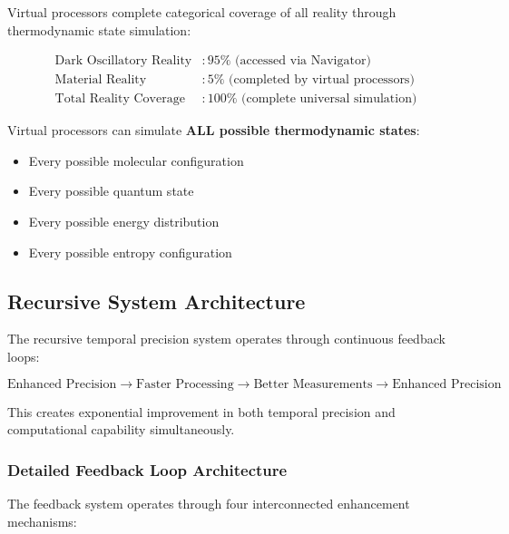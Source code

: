 \documentclass[11pt]{article}
\theoremstyle{remark}
\begin{document}
Virtual processors complete categorical coverage of all reality through thermodynamic state simulation:

\begin{align}
\text{Dark Oscillatory Reality} &: 95\% \text{ (accessed via Navigator)} \\
\text{Material Reality} &: 5\% \text{ (completed by virtual processors)} \\
\text{Total Reality Coverage} &: 100\% \text{ (complete universal simulation)}
\end{align}

Virtual processors can simulate \textbf{ALL possible thermodynamic states}:
\begin{itemize}
\item Every possible molecular configuration
\item Every possible quantum state
\item Every possible energy distribution
\item Every possible entropy configuration
\end{itemize}

\subsection{Recursive System Architecture}

The recursive temporal precision system operates through continuous feedback loops:

\begin{equation}
\text{Enhanced Precision} \rightarrow \text{Faster Processing} \rightarrow \text{Better Measurements} \rightarrow \text{Enhanced Precision}
\end{equation}

This creates exponential improvement in both temporal precision and computational capability simultaneously.

\subsubsection{Detailed Feedback Loop Architecture}

The feedback system operates through four interconnected enhancement mechanisms:
\end{document}
